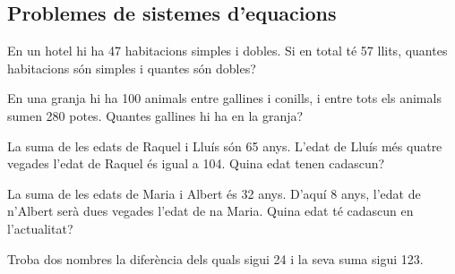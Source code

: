 \subsection{Problemes de sistemes d'equacions}

\begin{mylist}
\exer  En un hotel hi ha 47 habitacions simples i dobles. Si en total té 57 llits, quantes habitacions són simples i quantes són dobles?

\exer  En una granja hi ha 100 animals entre gallines i conills, i entre tots els animals sumen 280 potes. Quantes gallines hi ha en la granja?

\exer  La suma de les edats de Raquel i Lluís són 65 anys. L'edat de Lluís més quatre vegades l'edat de Raquel és igual a 104. Quina edat tenen cadascun?

\exer  La suma de les edats de Maria i Albert és 32 anys. D'aquí 8 anys, l'edat de n'Albert serà dues vegades l'edat de na Maria. Quina edat té cadascun en l'actualitat?

\exer  Troba dos nombres la diferència dels quals sigui 24 i la seva suma sigui 123.

\end{mylist}


